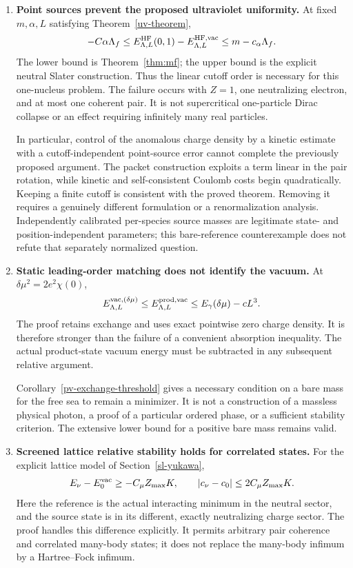 \begin{enumerate}
\item \textbf{Point sources prevent the proposed ultraviolet uniformity.}
At fixed \(m,\alpha,L\) satisfying Theorem~\ref{uv-theorem},
\[
 -C\alpha\Lambda_f
 \le E^{\rm HF}_{\Lambda,L}(0,1)-E^{\rm HF,\mathrm{vac}}_{\Lambda,L}
 \le m-c_\alpha\Lambda_f .
\]
The lower bound is Theorem~\ref{thm:mf}; the upper bound is the explicit
neutral Slater construction. Thus the linear cutoff order is necessary
for this one-nucleus problem. The failure occurs with \(Z=1\), one
neutralizing electron, and at most one coherent pair. It is not
supercritical one-particle Dirac collapse or an effect requiring
infinitely many real particles.

In particular, control of the anomalous charge density by a kinetic
estimate with a cutoff-independent point-source error cannot complete
the previously proposed argument. The packet construction exploits a
term linear in the pair rotation, while kinetic and self-consistent
Coulomb costs begin quadratically. Keeping a finite cutoff is consistent
with the proved theorem. Removing it requires a genuinely different
formulation or a renormalization analysis. Independently calibrated
per-species source masses are legitimate state- and position-independent
parameters; this bare-reference counterexample does not refute that
separately normalized question.

\item \textbf{Static leading-order matching does not identify the vacuum.}
At \(\delta\mu^2=2e^2\chi(0)\),
\[
 E^{\mathrm{vac},(\delta\mu)}_{\Lambda,L}
 \le E^{\rm prod,\mathrm{vac}}_{\Lambda,L}
 \le E_\gamma(\delta\mu)-cL^3 .
\]
The proof retains exchange and uses exact pointwise zero charge density.
It is therefore stronger than the failure of a convenient absorption
inequality. The actual product-state vacuum energy must be subtracted
in any subsequent relative argument.

Corollary~\ref{pv-exchange-threshold} gives a necessary condition on a
bare mass for the free sea to remain a minimizer. It is not a construction
of a massless physical photon, a proof of a particular ordered phase, or
a sufficient stability criterion. The extensive lower bound for a
positive bare mass remains valid.

\item \textbf{Screened lattice relative stability holds for correlated states.}
For the explicit lattice model of Section~\ref{sl-yukawa},
\[
 E_\nu-E_0^{\mathrm{vac}}\ge-C_\mu Z_{\max}K,
 \qquad
 |c_\nu-c_0|\le2C_\mu Z_{\max}K .
\]
Here the reference is the actual interacting minimum in the neutral
sector, and the source state is in its different, exactly neutralizing
charge sector. The proof handles this difference explicitly. It permits
arbitrary pair coherence and correlated many-body states; it does not
replace the many-body infimum by a Hartree--Fock infimum.


\end{enumerate}
